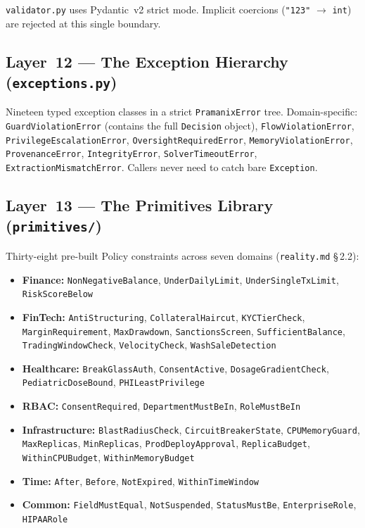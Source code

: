 \documentclass[12pt,a4paper,oneside]{report}
\newcommand{\fname}[1]{\texttt{#1}}          %
\newcommand{\code}[1]{\texttt{#1}}           %
\newcommand{\cfrsec}[1]{\S\,#1}             %
\begin{document}
\code{validator.py} uses Pydantic~v2 strict mode. Implicit coercions
(\code{"123"} $\to$ \code{int}) are rejected at this single boundary.

\subsection{Layer~12 --- The Exception Hierarchy (\fname{exceptions.py})}

Nineteen typed exception classes in a strict \code{PramanixError} tree.
Domain-specific: \code{GuardViolationError} (contains the full \code{Decision}
object), \code{FlowViolationError}, \code{PrivilegeEscalationError},
\code{OversightRequiredError}, \code{MemoryViolationError},
\code{ProvenanceError}, \code{IntegrityError}, \code{SolverTimeoutError},
\code{ExtractionMismatchError}. Callers never need to catch bare
\code{Exception}.

\subsection{Layer~13 --- The Primitives Library (\fname{primitives/})}

Thirty-eight pre-built Policy constraints across seven domains
(\fname{reality.md} \cfrsec{2.2}):

\begin{itemize}
  \item \textbf{Finance:} \code{NonNegativeBalance}, \code{UnderDailyLimit},
        \code{UnderSingleTxLimit}, \code{RiskScoreBelow}
  \item \textbf{FinTech:} \code{AntiStructuring}, \code{CollateralHaircut},
        \code{KYCTierCheck}, \code{MarginRequirement}, \code{MaxDrawdown},
        \code{SanctionsScreen}, \code{SufficientBalance},
        \code{TradingWindowCheck}, \code{VelocityCheck}, \code{WashSaleDetection}
  \item \textbf{Healthcare:} \code{BreakGlassAuth}, \code{ConsentActive},
        \code{DosageGradientCheck}, \code{PediatricDoseBound},
        \code{PHILeastPrivilege}
  \item \textbf{RBAC:} \code{ConsentRequired}, \code{DepartmentMustBeIn},
        \code{RoleMustBeIn}
  \item \textbf{Infrastructure:} \code{BlastRadiusCheck},
        \code{CircuitBreakerState}, \code{CPUMemoryGuard}, \code{MaxReplicas},
        \code{MinReplicas}, \code{ProdDeployApproval}, \code{ReplicaBudget},
        \code{WithinCPUBudget}, \code{WithinMemoryBudget}
  \item \textbf{Time:} \code{After}, \code{Before}, \code{NotExpired},
        \code{WithinTimeWindow}
  \item \textbf{Common:} \code{FieldMustEqual}, \code{NotSuspended},
        \code{StatusMustBe}, \code{EnterpriseRole}, \code{HIPAARole}
\end{itemize}
\end{document}
